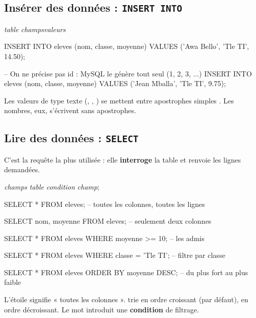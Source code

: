 \subsection{Insérer des données : \texttt{INSERT INTO}}

\begin{syntaxe}
 \textit{table} \code{(}\textit{champs}\textit{valeurs}\code{);}
\end{syntaxe}

\begin{codesql}
INSERT INTO eleves (nom, classe, moyenne)
VALUES ('Awa Bello', 'Tle TI', 14.50);

-- On ne précise pas id : MySQL le génère tout seul (1, 2, 3, ...)
INSERT INTO eleves (nom, classe, moyenne)
VALUES ('Jean Mballa', 'Tle TI', 9.75);
\end{codesql}

\begin{attention}
Les valeurs de type texte (, , ) se mettent
entre apostrophes simples . Les nombres, eux, s'écrivent sans
apostrophes.
\end{attention}

\subsection{Lire des données : \texttt{SELECT}}

C'est la requête la plus utilisée : elle \textbf{interroge} la table et renvoie
les lignes demandées.

\begin{syntaxe}
 \textit{champs}  \textit{table}  \textit{condition}  \textit{champ};
\end{syntaxe}

\begin{codesql}
SELECT * FROM eleves;                    -- toutes les colonnes, toutes les lignes

SELECT nom, moyenne FROM eleves;         -- seulement deux colonnes

SELECT * FROM eleves WHERE moyenne >= 10;        -- les admis

SELECT * FROM eleves WHERE classe = 'Tle TI';    -- filtre par classe

SELECT * FROM eleves ORDER BY moyenne DESC;      -- du plus fort au plus faible
\end{codesql}

\begin{remarque}
L'étoile \code{*} signifie « toutes les colonnes ». 
trie en ordre croissant (par défaut),  en ordre décroissant. Le mot
 introduit une \textbf{condition} de filtrage.
\end{remarque}


